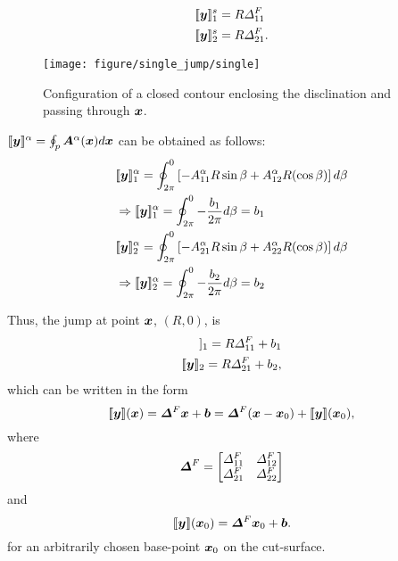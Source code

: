 \documentclass[11pt,letterpaper]{article}
\begin{document}
\begin{eqnarray}\label{eqn:disclination_part}
\begin{aligned}
&[\![\bfy]\!]^s_1= R \Delta^F_{11} \\
&[\![\bfy]\!]^s_2= R \Delta^F_{21}.
\end{aligned}
\end{eqnarray}

\begin{figure}
\centering
\texttt{[image: figure/single\_jump/single]}
\caption{Configuration of a closed contour enclosing the disclination and passing through $\bfx$.}
\label{fig:contour}
\end{figure}

$[\![\bfy]\!]^{\alpha} = \oint_p \bfA^{\alpha}(\bfx)d\bfx$ can be obtained as follows:
\begin{eqnarray*}
&[\![\bfy]\!]^{\alpha}_1 = \oint^{0}_{2\pi} \left[-A^{\alpha}_{11}R \sin \beta + A^{\alpha}_{12}R (\cos \beta)\right] d\beta \\
&\Rightarrow [\![\bfy]\!]^{\alpha}_1 = \oint^{0}_{2\pi} - \frac{b_1}{2\pi}d\beta = b_1 \\
&[\![\bfy]\!]^{\alpha}_2 = \oint^{0}_{2\pi} \left[-A^{\alpha}_{21}R \sin \beta + A^{\alpha}_{22}R (\cos \beta)\right] d\beta \\
&\Rightarrow [\![\bfy]\!]^{\alpha}_2 = \oint^{0}_{2\pi} - \frac{b_2}{2\pi}d\beta = b_2 
\end{eqnarray*}

Thus, the jump at point $\bfx$, $(R,0)$, is 
\begin{align*}
[\![\bfy]\!]_1=R \Delta^F_{11} + b_1 \\
[\![\bfy]\!]_2=R \Delta^F_{21} + b_2,
\end{align*}
which can be written in the form
\begin{equation}  \label{eqn:delta}
[\![\bfy]\!](\bfx) = \bfDelta^F \bfx + \bfb = \bfDelta^F(\bfx - \bfx_0) + \llbracket \bfy \rrbracket (\bfx_0),
\end{equation}
where 
\begin{equation*}
\bfDelta^F = 
\begin{bmatrix}
\Delta^F_{11} & \Delta^F_{12} \\
\Delta^F_{21} & \Delta^F_{22}\\
\end{bmatrix}
\end{equation*}
and
\[
\llbracket \bfy \rrbracket (\bfx_0)  = \bfDelta^F \bfx_0 + \bfb.
\]
for an arbitrarily chosen base-point $\bfx_0$ on the cut-surface.
\end{document}
